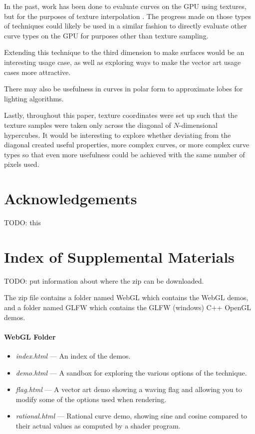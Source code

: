 \documentclass{jcgt}
\begin{document}
In the past, work has been done to evaluate curves on the GPU using textures, but for the purposes of texture interpolation \cite{doi:10.1080/2151237X.2008.10129269}.  The progress made on those types of techniques could likely be used in a similar fashion to directly evaluate other curve types on the GPU for purposes other than texture sampling.

Extending this technique to the third dimension to make surfaces would be an interesting usage case, as well as exploring ways to make the vector art usage cases more attractive.

There may also be usefulness in curves in polar form to approximate lobes for lighting algorithms.

Lastly, throughout this paper, texture coordinates were set up such that the texture samples were taken only across the diagonal of $N$-dimensional hypercubes.  It would be interesting to explore whether deviating from the diagonal created useful properties, more complex curves, or more complex curve types so that even more usefulness could be achieved with the same number of pixels used.

\section*{Acknowledgements}
\label{sec:acknowledgements}
TODO: this

\small



\section*{Index of Supplemental Materials}
\label{sec:indexofsupplementalmaterials}
TODO: put information about where the zip can be downloaded.

The zip file contains a folder named WebGL which contains the WebGL demos, and a folder named GLFW which contains the GLFW (windows) C++ OpenGL demos.

\paragraph{\textbf{WebGL Folder}}
\begin{itemize}
  \item \textit{index.html} --- An index of the demos.
  \item \textit{demo.html} --- A sandbox for exploring the various options of the technique.
  \item \textit{flag.html} --- A vector art demo showing a waving flag and allowing you to modify some of the options used when rendering.
  \item \textit{rational.html} --- Rational curve demo, showing sine and cosine compared to their actual values as computed by a shader program.
\end{itemize}
\end{document}
